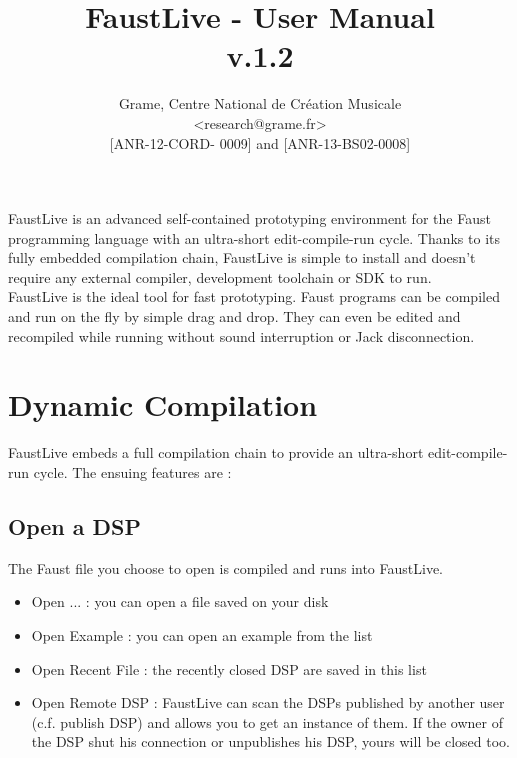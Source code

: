 \documentclass[a4paper]{article}
\begin{document}
\title{FaustLive - User Manual \\ v.1.2}

\author{Grame, Centre National de Création Musicale\\
{\small <research@grame.fr>} \\
\vspace{2mm}
[ANR-12-CORD- 0009] and [ANR-13-BS02-0008]
}

\maketitle


\vspace{\fill}

FaustLive is an advanced self-contained prototyping environment for the Faust programming language with an ultra-short edit-compile-run cycle. Thanks to its fully embedded compilation chain, FaustLive is simple to install and doesn't require any external compiler, development toolchain or SDK to run. \\

FaustLive is the ideal tool for fast prototyping. Faust programs can be compiled and run on the fly by simple drag and drop. They can even be edited and recompiled while running without sound interruption or Jack disconnection.
\vspace{\fill}
\newpage
\tableofcontents

\newpage
\section{Dynamic Compilation}
FaustLive embeds a full compilation chain to provide an ultra-short edit-compile-run cycle.
The ensuing features are :

\subsection{Open a DSP}
The Faust file you choose to open is compiled and runs into FaustLive.
\begin{itemize}
\item Open ... : you can open a file saved on your disk
\item Open Example : you can open an example from the list
\item Open Recent File : the recently closed DSP are saved in this list
\item Open Remote DSP : FaustLive can scan the DSPs published by another user (c.f. publish DSP) and allows you to get an instance of them. If the owner of the DSP shut his connection or unpublishes his DSP, yours will be closed too. 
\end{itemize}
\end{document}
